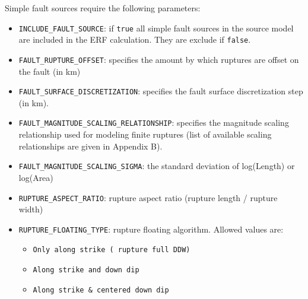 Simple fault sources require the following parameters:
\begin{itemize}
\item \Verb+INCLUDE_FAULT_SOURCE+: if \Verb+true+ all simple fault sources in the source model are included in the ERF calculation. They are exclude if \Verb+false+.
\item \Verb+FAULT_RUPTURE_OFFSET+: specifies the amount by which ruptures are offset on the fault (in km)
\item \Verb+FAULT_SURFACE_DISCRETIZATION+: specifies the fault surface discretization step (in km).
\item \Verb+FAULT_MAGNITUDE_SCALING_RELATIONSHIP+: specifies the magnitude scaling relationship used for modeling finite ruptures (list of available scaling relationships are given in Appendix B).
\item \Verb+FAULT_MAGNITUDE_SCALING_SIGMA+: the standard deviation of log(Length) or log(Area)
\item \Verb+RUPTURE_ASPECT_RATIO+: rupture aspect ratio (rupture length / rupture width)
\item \Verb+RUPTURE_FLOATING_TYPE+: rupture floating algorithm. Allowed values are:
\begin{itemize}
\item \Verb+Only along strike ( rupture full DDW)+
\item \Verb+Along strike and down dip+
\item \Verb+Along strike & centered down dip+
\end{itemize}
\end{itemize}

